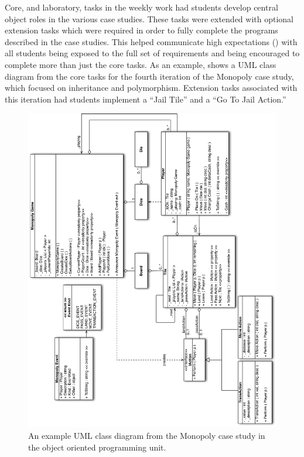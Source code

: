 Core, and laboratory, tasks in the weekly work had students develop central object roles in the various case studies. These tasks were extended with optional extension tasks which were required in order to fully complete the programs described in the case studies. This helped communicate high expectations () with all students being exposed to the full set of requirements and being encouraged to complete more than just the core tasks. As an example,  shows a UML class diagram from the core tasks for the fourth iteration of the Monopoly case study, which focused on inheritance and polymorphism. Extension tasks associated with this iteration had students implement a ``Jail Tile'' and a ``Go To Jail Action.''


\begin{figure}[p]
	\centering
	\includegraphics[width=\textwidth]{Monopoly1}
	\caption{An example UML class diagram from the Monopoly case study in the object oriented programming unit. }
	\label{fig:monopoly}
\end{figure}

